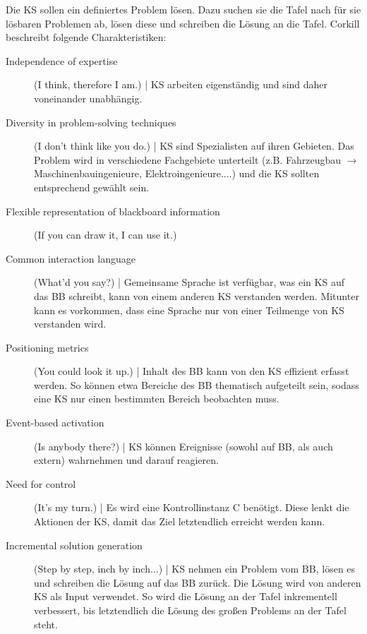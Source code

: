 \documentclass{article} %
\begin{document}
	Die KS sollen ein definiertes Problem lösen.
	Dazu suchen sie die Tafel nach für sie lösbaren Problemen ab, lösen diese und schreiben die Lösung an die Tafel.
	Corkill beschreibt folgende Charakteristiken:
	\begin{description}
		\item[Independence of expertise] (I think, therefore I am.) | KS arbeiten eigenständig und sind daher voneinander unabhängig.
		\item[Diversity in problem-solving techniques] (I don’t think like you do.) | KS sind Spezialisten auf ihren Gebieten.
		Das Problem wird in verschiedene Fachgebiete unterteilt (z.B. Fahrzeugbau $\rightarrow$ Maschinenbauingenieure, Elektroingenieure....) und die KS sollten entsprechend gewählt sein.
		\item[Flexible representation of blackboard information] (If you can draw it, I can use it.) 
		\item[Common interaction language] (What’d you say?) | Gemeinsame Sprache ist verfügbar, was ein KS auf das BB schreibt, kann von einem anderen KS verstanden werden.
		Mitunter kann es vorkommen, dass eine Sprache nur von einer Teilmenge von KS verstanden wird.
		\item[Positioning metrics] (You could look it up.) | Inhalt des BB kann von den KS effizient erfasst werden.
		So können etwa Bereiche des BB thematisch aufgeteilt sein, sodass eine KS nur einen bestimmten Bereich beobachten muss.
		\item[Event-based activation] (Is anybody there?) | KS können Ereignisse (sowohl auf BB, als auch extern) wahrnehmen und darauf reagieren.	
		\item[Need for control] (It’s my turn.) | Es wird eine Kontrollinstanz C benötigt.
		Diese lenkt die Aktionen der KS, damit das Ziel letztendlich erreicht werden kann.
		\item[Incremental solution generation] (Step by step, inch by inch...) | KS nehmen ein Problem vom BB, lösen es und schreiben die Lösung auf das BB zurück.
		Die Lösung wird von anderen KS als Input verwendet.
		So wird die Lösung an der Tafel inkrementell verbessert, bis letztendlich die Lösung des großen Problems an der Tafel steht.
	\end{description}
\end{document}

